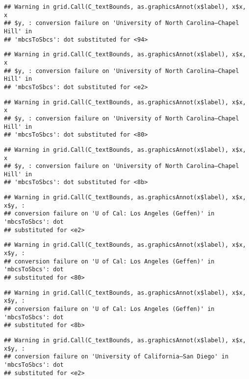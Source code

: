 \documentclass[]{article}
\begin{document}
\begin{verbatim}
## Warning in grid.Call(C_textBounds, as.graphicsAnnot(x$label), x$x, x
## $y, : conversion failure on 'University of North Carolina—​Chapel Hill' in
## 'mbcsToSbcs': dot substituted for <94>
\end{verbatim}

\begin{verbatim}
## Warning in grid.Call(C_textBounds, as.graphicsAnnot(x$label), x$x, x
## $y, : conversion failure on 'University of North Carolina—​Chapel Hill' in
## 'mbcsToSbcs': dot substituted for <e2>
\end{verbatim}

\begin{verbatim}
## Warning in grid.Call(C_textBounds, as.graphicsAnnot(x$label), x$x, x
## $y, : conversion failure on 'University of North Carolina—​Chapel Hill' in
## 'mbcsToSbcs': dot substituted for <80>
\end{verbatim}

\begin{verbatim}
## Warning in grid.Call(C_textBounds, as.graphicsAnnot(x$label), x$x, x
## $y, : conversion failure on 'University of North Carolina—​Chapel Hill' in
## 'mbcsToSbcs': dot substituted for <8b>
\end{verbatim}

\begin{verbatim}
## Warning in grid.Call(C_textBounds, as.graphicsAnnot(x$label), x$x, x$y, :
## conversion failure on 'U of Cal: ​Los Angeles (Geffen)' in 'mbcsToSbcs': dot
## substituted for <e2>
\end{verbatim}

\begin{verbatim}
## Warning in grid.Call(C_textBounds, as.graphicsAnnot(x$label), x$x, x$y, :
## conversion failure on 'U of Cal: ​Los Angeles (Geffen)' in 'mbcsToSbcs': dot
## substituted for <80>
\end{verbatim}

\begin{verbatim}
## Warning in grid.Call(C_textBounds, as.graphicsAnnot(x$label), x$x, x$y, :
## conversion failure on 'U of Cal: ​Los Angeles (Geffen)' in 'mbcsToSbcs': dot
## substituted for <8b>
\end{verbatim}

\begin{verbatim}
## Warning in grid.Call(C_textBounds, as.graphicsAnnot(x$label), x$x, x$y, :
## conversion failure on 'University of California—​San Diego' in 'mbcsToSbcs': dot
## substituted for <e2>
\end{verbatim}
\end{document}
